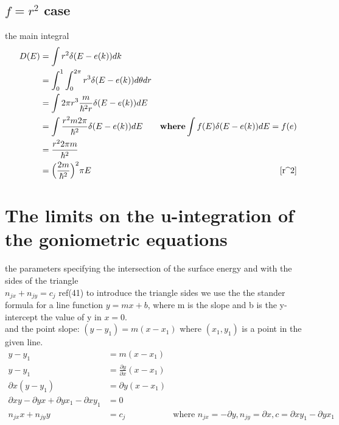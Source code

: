 \documentclass[11pt,a4paper]{article}
\begin{document}
\subsection{$f = r^2$ case}
the main integral
\begin{align}
D(E) &= \int r^2 \delta(E-e(k))dk \\
&= \int_0^1 \int_0^{2\pi}r^3\delta(E-e(k))d\theta dr\\
&= \int 2\pi r^3 \frac{m}{\hbar^2 r}\delta(E-e(k))dE\\ 
&= \int \frac{r^2 m 2\pi}{\hbar ^2}\delta(E-e(k))dE & \textbf{where} \int f(E) \delta(E-e(k))dE  = f(e) \\
&= \frac{r^2 2\pi m}{\hbar^2}\\
&= \Big(\frac{2 m}{\hbar^2}\Big)^2 \pi E  & \ref{r^2}
\end{align}
\section{The limits on the u-integration of the goniometric equations}
the parameters specifying the intersection of the surface energy and with the sides of the triangle \\
$n_{jx}+n_{jy} = c_j $    ref(41)
to introduce the triangle sides we use the the stander formula for a line function $y = mx + b$, where m is the slope and b is the y-intercept the value of y in $x =  0$. \\
and the point slope:  $ (y-y_1) = m (x-x_1)$ where $(x_1,y_1)$ is a point in the given line.
\begin{align}
y-y_1 &= m (x-x_1)\\
y-y_1 &= \frac{\partial y}{\partial x} (x-x_1) \\
\partial x  (y-y_1) & = \partial y (x-x_1)\\ 
\partial x y - \partial y x + \partial y x_1 - \partial x y_1 &= 0 \\
n_{jx}x+n_{jy}y &= c_j & \text{where  } n_{jx} =  - \partial y, n_{jy}= \partial x , c = \partial x y_1 - \partial y x_1
\end{align}
\end{document}

